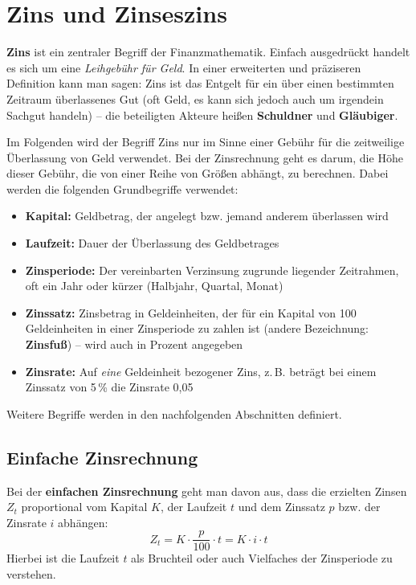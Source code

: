 \section{Zins und Zinseszins}

\textbf{Zins} ist ein zentraler Begriff der Finanzmathematik. Einfach ausgedrückt handelt es sich um eine \emph{Leihgebühr für Geld}. In einer erweiterten und präziseren Definition kann man sagen: Zins ist das Entgelt für ein über einen bestimmten Zeitraum überlassenes Gut (oft Geld, es kann sich jedoch auch um irgendein Sachgut handeln) -- die beteiligten Akteure heißen \textbf{Schuldner} und \textbf{Gläubiger}.

Im Folgenden wird der Begriff Zins nur im Sinne einer Gebühr für die zeitweilige Überlassung von Geld verwendet. Bei der Zinsrechnung geht es darum, die Höhe dieser Gebühr, die von einer Reihe von Größen abhängt, zu berechnen. Dabei werden die folgenden Grundbegriffe verwendet:
\begin{itemize}
  \item \textbf{Kapital:} Geldbetrag, der angelegt bzw. jemand anderem überlassen wird
  \item \textbf{Laufzeit:} Dauer der Überlassung des Geldbetrages
  \item \textbf{Zinsperiode:} Der vereinbarten Verzinsung zugrunde liegender Zeitrahmen, oft ein Jahr oder kürzer (Halbjahr, Quartal, Monat)
  \item \textbf{Zinssatz:} Zinsbetrag in Geldeinheiten, der für ein Kapital von 100 Geldeinheiten in einer Zinsperiode zu zahlen ist (andere Bezeichnung: \textbf{Zinsfuß}) -- wird auch in Prozent angegeben
  \item \textbf{Zinsrate:} Auf \emph{eine} Geldeinheit bezogener Zins, z.\,B. beträgt bei einem Zinssatz von 5\,\% die Zinsrate 0{,}05
\end{itemize}

Weitere Begriffe werden in den nachfolgenden Abschnitten definiert.

\subsection{Einfache Zinsrechnung}

Bei der \textbf{einfachen Zinsrechnung} geht man davon aus, dass die erzielten Zinsen $Z_t$ proportional vom Kapital $K$, der Laufzeit $t$ und dem Zinssatz $p$ bzw. der Zinsrate $i$ abhängen:
\[ Z_t = K \cdot \frac{p}{100} \cdot t = K \cdot i \cdot t \]
Hierbei ist die Laufzeit $t$ als Bruchteil oder auch Vielfaches der Zinsperiode zu verstehen.

